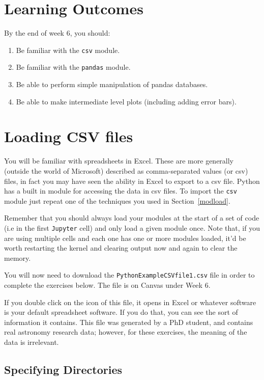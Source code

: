 \section{Learning Outcomes}
\label{Chapter6}

By the end of week 6, you should:

\begin{enumerate}
\item Be familiar with the {\tt csv} module.
\item Be familiar with the \texttt{pandas} module.
\item Be able to perform simple manipulation of pandas databases.
\item Be able to make intermediate level plots (including adding error bars).
\end{enumerate}


\section{Loading CSV files}
\label{sec:csv}

You will be familiar with spreadsheets in Excel. These are more generally (outside the world of Microsoft) described as comma-separated values (or csv) files, in fact you may have seen the ability in Excel to export to a csv file. Python has a built in module for accessing the data in csv files. To import the {\tt csv} module just repeat one of the techniques you used in Section~\ref{modload}.

Remember that you should always load your modules at the start of a set of code (i.e  in the first \texttt{Jupyter} cell) and only load a given module once. Note that, if you are using multiple cells and each one has one or more modules loaded, it'd be worth restarting the kernel and clearing output now and again to clear the memory.

You will now need to download the \texttt{PythonExampleCSVfile1.csv} file in order to complete the exercises below. The file is on Canvas under Week 6.

If you double click on the icon of this file, it opens in Excel or whatever software is your default spreadsheet software. If you do that, you can see the sort of information it contains. This file was generated by a PhD student, and contains real astronomy research data; however, for these exercises, the meaning of the data is irrelevant.

\newpage

\subsection{Specifying Directories}
\label{sec:directories}

